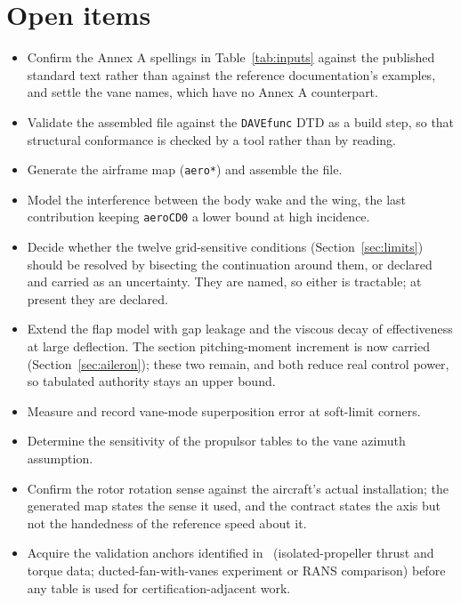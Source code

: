 \documentclass[11pt,a4paper]{article}
\newcommand{\varid}[1]{\texttt{\small #1}}
\begin{document}
\section{Open items}
\label{sec:open}

\begin{itemize}
\item Confirm the Annex A spellings in Table~\ref{tab:inputs} against
the published standard text rather than against the reference
documentation's examples, and settle the vane names, which have no
Annex A counterpart.
\item Validate the assembled file against the \texttt{DAVEfunc} DTD as a
build step, so that structural conformance is checked by a tool rather
than by reading.
\item Generate the airframe map (\varid{aero*}) and assemble the file.
\item Model the interference between the body wake and the wing, the
last contribution keeping \varid{aeroCD0} a lower bound at high
incidence.
\item Decide whether the twelve grid-sensitive conditions
(Section~\ref{sec:limits}) should be resolved by bisecting the continuation
around them, or declared and carried as an uncertainty. They are named, so
either is tractable; at present they are declared.
\item Extend the flap model with gap leakage and the viscous decay of
effectiveness at large deflection. The section pitching-moment
increment is now carried (Section~\ref{sec:aileron}); these two remain,
and both reduce real control power, so tabulated authority stays an
upper bound.
\item Measure and record vane-mode superposition error at soft-limit
corners.
\item Determine the sensitivity of the propulsor tables to the vane
azimuth assumption.
\item Confirm the rotor rotation sense against the aircraft's actual
installation; the generated map states the sense it used, and the
contract states the axis but not the handedness of the reference speed
about it.
\item Acquire the validation anchors identified in~\cite{scitech}
(isolated-propeller thrust and torque data; ducted-fan-with-vanes
experiment or RANS comparison) before any table is used for
certification-adjacent work.
\end{itemize}
\end{document}
